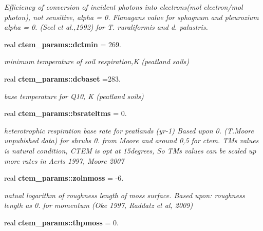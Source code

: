 \begin{DoxyCompactItemize}
\begin{DoxyCompactList}\small\item\em Efficiency of conversion of incident photons into electrons(mol electron/mol photon), not sensitive, alpha = 0. Flanagan\textquotesingle{}s value for sphagnum and pleurozium alpha = 0. (Seel et al.,1992) for T. ruraliformis and d. palustris. \end{DoxyCompactList}\item 
\hypertarget{namespacectem__params_aa98fb2b4f1bd31eac28fcbb8ab6d8667}{}real {\bfseries ctem\+\_\+params\+::dctmin} = 269.\label{namespacectem__params_aa98fb2b4f1bd31eac28fcbb8ab6d8667}

\begin{DoxyCompactList}\small\item\em minimum temperature of soil respiration,K (peatland soils) \end{DoxyCompactList}\item 
\hypertarget{namespacectem__params_a720de170a379ed4cd4fa79b3568adeee}{}real {\bfseries ctem\+\_\+params\+::dcbaset} =283.\label{namespacectem__params_a720de170a379ed4cd4fa79b3568adeee}

\begin{DoxyCompactList}\small\item\em base temperature for Q10, K (peatland soils) \end{DoxyCompactList}\item 
\hypertarget{namespacectem__params_aba3dc779db095e9a91c71fa765ce42c5}{}real {\bfseries ctem\+\_\+params\+::bsrateltms} = 0.\label{namespacectem__params_aba3dc779db095e9a91c71fa765ce42c5}

\begin{DoxyCompactList}\small\item\em heterotrophic respiration base rate for peatlands (yr-\/1) Based upon 0. (T.\+Moore unpubished data) for shrubs 0. from Moore and around 0,5 for ctem. T\+M\textquotesingle{}s values is natural condition, C\+T\+E\+M is opt at 15degrees, So T\+M\textquotesingle{}s values can be scaled up more rates in Aerts 1997, Moore 2007 \end{DoxyCompactList}\item 
\hypertarget{namespacectem__params_a2ccf9899714e74accc20f0ac2effd33c}{}real {\bfseries ctem\+\_\+params\+::zolnmoss} = -\/6.\label{namespacectem__params_a2ccf9899714e74accc20f0ac2effd33c}

\begin{DoxyCompactList}\small\item\em natual logarithm of roughness length of moss surface. Based upon\+: roughness length as 0. for momentum (Oke 1997, Raddatz et al, 2009) \end{DoxyCompactList}\item 
\hypertarget{namespacectem__params_a1f10073e9d589f7bc3240bec9f3d6516}{}real {\bfseries ctem\+\_\+params\+::thpmoss} = 0.\label{namespacectem__params_a1f10073e9d589f7bc3240bec9f3d6516}


\end{DoxyCompactItemize}
